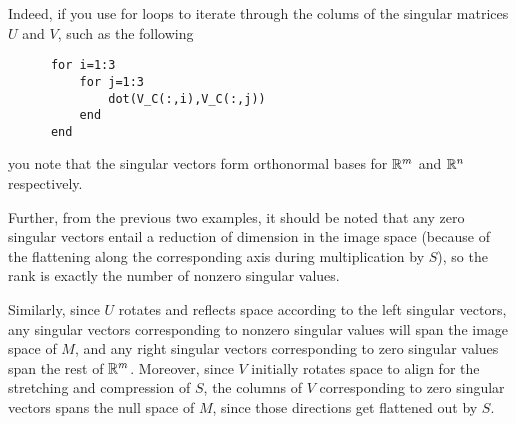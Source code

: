 \documentclass{ximera}
\begin{document}
\begin{problem}
\begin{problem}
\begin{problem}
\begin{selectAll}

  \end{selectAll}

  \begin{feedback}
  
    Indeed, if you use for loops to iterate through the colums of the singular matrices $U$ and $V$, such as the following

    \begin{verbatim}
      for i=1:3
          for j=1:3
              dot(V_C(:,i),V_C(:,j))
          end
      end
    \end{verbatim}

    you note that the singular vectors form orthonormal bases for $\mathbb{R}^m$ and $\mathbb{R}^n$ respectively.

    Further, from the previous two examples, it should be noted that any zero singular vectors entail a reduction of dimension in the image space (because of the flattening along the corresponding axis during multiplication by $S$), so the rank is exactly the number of nonzero singular values. 
    
    Similarly, since $U$ rotates and reflects space according to the left singular vectors, any singular vectors corresponding to nonzero singular values will span the image space of $M$, and any right singular vectors corresponding to zero singular values span the rest of $\mathbb{R}^m$. Moreover, since $V$ initially rotates space to align for the stretching and compression of $S$, the columns of $V$ corresponding to zero singular vectors spans the null space of $M$, since those directions get flattened out by $S$.


\end{feedback}
\end{problem}
\end{problem}
\end{problem}
\end{document}
